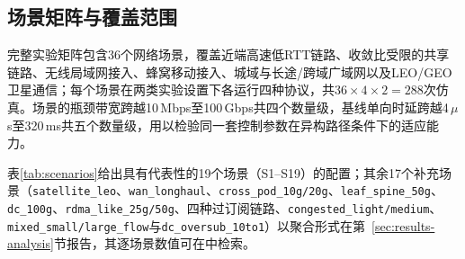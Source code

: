 \subsection{场景矩阵与覆盖范围}

完整实验矩阵包含36个网络场景，覆盖近端高速低RTT链路、收敛比受限的共享链路、无线局域网接入、蜂窝移动接入、城域与长途/跨域广域网以及LEO/GEO卫星通信；每个场景在两类实验设置下各运行四种协议，共$36 \times 4 \times 2 = 288$次仿真。场景的瓶颈带宽跨越10\,Mbps至100\,Gbps共四个数量级，基线单向时延跨越4\,$\mu$s至320\,ms共五个数量级，用以检验同一套控制参数在异构路径条件下的适应能力。

表\ref{tab:scenarios}给出具有代表性的19个场景（S1--S19）的配置；其余17个补充场景（\texttt{satellite\_leo}、\texttt{wan\_longhaul}、\texttt{cross\_pod\_10g/20g}、\texttt{leaf\_spine\_50g}、\texttt{dc\_100g}、\texttt{rdma\_like\_25g/50g}、四种过订阅链路、\texttt{congested\_light/medium}、\texttt{mixed\_small/large\_flow}与\texttt{dc\_oversub\_10to1}）以聚合形式在第~\ref{sec:results-analysis}节报告，其逐场景数值可在中检索。

